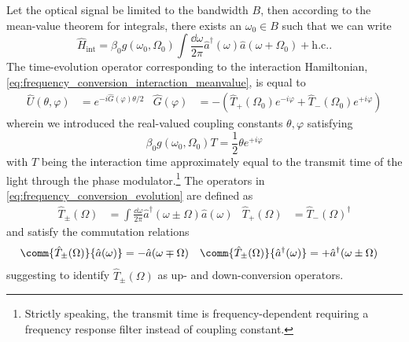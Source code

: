 Let the optical signal be limited to the bandwidth $B$, then
according to the mean-value theorem for integrals, there exists an $\omega_0\in B$ such that we can write
\begin{equation}
	\hat{H}_\text{int}
	=
	\beta_0
	g(\omega_0,\Omega_0)
	\int\frac{\dd{\omega}}{2\pi}
	\hat{a}^\dagger(\omega)
	\hat{a}(\omega+\Omega_0)
	+
	\text{h.c.}
	\label{eq:frequency_conversion_interaction_meanvalue}
	.
\end{equation}
The time-evolution operator corresponding to the interaction Hamiltonian, \cref{eq:frequency_conversion_interaction_meanvalue}, is equal to
\begin{align}
	\hat{U}(\theta,\varphi)
	&=
	e^{-i\hat{G}(\varphi)\theta/2}
	&
	\hat{G}(\varphi)
	&=
	-
	\left(
		\hat{T}_+(\Omega_0)
		e^{-i\varphi}
		+
		\hat{T}_-(\Omega_0)
		e^{+i\varphi}
	\right)
	\label{eq:frequency_conversion_evolution}
\end{align}
wherein we introduced the real-valued coupling constants $\theta,\varphi$ satisfying
\begin{equation}
	\beta_0
	g(\omega_0,\Omega_0)
	T
	=
	\frac{1}{2}
	\theta
	e^{+i\varphi}
\end{equation}
with $T$ being the interaction time approximately equal to the transmit time of the light through the phase modulator.\footnote{Strictly speaking, the transmit time is frequency-dependent requiring a frequency response filter instead of coupling constant.}
The operators in \cref{eq:frequency_conversion_evolution} are defined as
\begin{align}
	\hat{T}_\pm(\Omega)
	&=
	\int\frac{\dd{\omega}}{2\pi}
	\hat{a}^\dagger(\omega\pm\Omega)
	\hat{a}(\omega)
	&
	\hat{T}_+(\Omega)
	&=
	\hat{T}_-(\Omega)^\dagger
\end{align}
and satisfy the commutation relations
\begin{align}
	\comm{\hat{T}_\pm(\Omega)}{\hat{a}(\omega)}
	&=
	-
	\hat{a}(\omega\mp\Omega)
	&
	\comm{\hat{T}_\pm(\Omega)}{\hat{a}^\dagger(\omega)}
	&=
	+
	\hat{a}^\dagger(\omega\pm\Omega)
\end{align}
suggesting to identify $\hat{T}_\pm(\Omega)$ as up- and down-conversion operators.




